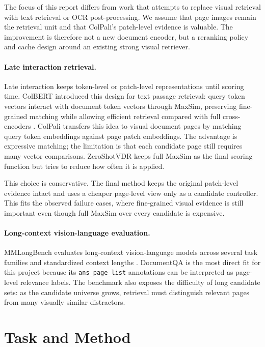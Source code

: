 \documentclass[11pt]{article}
\begin{document}
The focus of this report differs from work that attempts to replace visual retrieval with text retrieval or OCR post-processing. We assume that page images remain the retrieval unit and that ColPali's patch-level evidence is valuable. The improvement is therefore not a new document encoder, but a reranking policy and cache design around an existing strong visual retriever.

\paragraph{Late interaction retrieval.}
Late interaction keeps token-level or patch-level representations until scoring time. ColBERT introduced this design for text passage retrieval: query token vectors interact with document token vectors through MaxSim, preserving fine-grained matching while allowing efficient retrieval compared with full cross-encoders \citep{khattab2020colbert}. ColPali transfers this idea to visual document pages by matching query token embeddings against page patch embeddings. The advantage is expressive matching; the limitation is that each candidate page still requires many vector comparisons. ZeroShotVDR keeps full MaxSim as the final scoring function but tries to reduce how often it is applied.

This choice is conservative. The final method keeps the original patch-level evidence intact and uses a cheaper page-level view only as a candidate controller. This fits the observed failure cases, where fine-grained visual evidence is still important even though full MaxSim over every candidate is expensive.

\paragraph{Long-context vision-language evaluation.}
MMLongBench evaluates long-context vision-language models across several task families and standardized context lengths \citep{wang2025mmlongbench}. DocumentQA is the most direct fit for this project because its \texttt{ans\_page\_list} annotations can be interpreted as page-level relevance labels. The benchmark also exposes the difficulty of long candidate sets: as the candidate universe grows, retrieval must distinguish relevant pages from many visually similar distractors.

\section{Task and Method}
\end{document}
